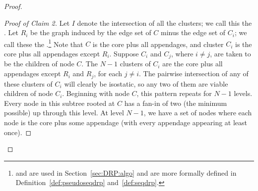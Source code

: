 \begin{proof}
\begin{proof}[Proof of Claim 2]
        Let $I$ denote the intersection of all the clusters; we call this the . Let $R_i$ be the graph induced by the edge set of $C$ minus the edge set of $C_i$; we call these the .\footnote{ and  are used in Section~\ref{sec:DRP:algo} and are more formally defined in Definition~\ref{def:pseudoseqdrp} and~\ref{def:seqdrp}.} Note that $C$ is the core plus all appendages, and cluster $C_i$ is the core plus all appendages except $R_i$.
        Suppose $C_i$ and $C_j$, where $i\neq j$, are taken to be the children of node $C$.
        The $N-1$ clusters of $C_i$ are the core plus all appendages except $R_i$ and $R_j$, for each $j\neq i$. The pairwise intersection of any of these clusters of $C_i$ will clearly be isostatic, so any two of them are viable children of node $C_i$.
        Beginning with node $C$, this pattern repeats for $N-1$ levels. Every node in this subtree rooted at $C$ has a fan-in of two (the minimum possible) up through this level. At level $N-1$, we have a set of nodes where each node is the core plus some appendage (with every appendage appearing at least once).

\end{proof}
\end{proof}

